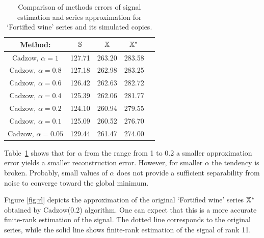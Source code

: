 \documentclass[sii]{ipart}
\begin{document}
%
%

\begin{table}
	\caption{Comparison of methods errors of signal estimation and series approximation for `Fortified wine' series and its simulated copies.}
\label{tab:rltable}
	
	\begin{tabular*}{\textwidth}{@{\extracolsep{\fill}}ccccc}
		\hline
		Method: & $\mathbb{S}$ & $\mathbb{X}$ & $\mathbb{X}^*$ \\
		\hline
		Cadzow, $\alpha = 1$ & 127.71 & 263.20 & 283.58 \\
		\hline
		Cadzow, $\alpha = 0.8$ & 127.18 & 262.98 & 283.25 \\
		\hline
		Cadzow, $\alpha = 0.6$ & 126.42 & 262.63 & 282.72 \\
		\hline
		Cadzow, $\alpha = 0.4$ & 125.39 & 262.06 & 281.77 \\
		\hline
		Cadzow, $\alpha = 0.2$ & 124.10 & 260.94 & 279.55 \\
		\hline
		Cadzow, $\alpha = 0.1$ & 125.09 & 260.52 & 276.70 \\
		\hline
		Cadzow, $\alpha = 0.05$ & 129.44 & 261.47 & 274.00 \\
		\hline
	\end{tabular*}
\end{table}

Table~\ref{tab:rltable} shows that for $\alpha$ from the range from 1 to 0.2
a smaller approximation error yields a smaller reconstruction error. However, for smaller $\alpha$
the tendency is broken. Probably, small values of $\alpha$ does not provide a sufficient separability from noise
to converge toward the global minimum. 


Figure \ref{fig:rl} depicts the approximation of the original `Fortified wine' series $\mathbb{X}^*$ obtained by Cadzow($0.2$) algorithm. 
One can expect that this is a more accurate finite-rank estimation of the signal.
The dotted line corresponds to the original series, while the solid line shows finite-rank estimation of the signal of rank 11.
\end{document}
